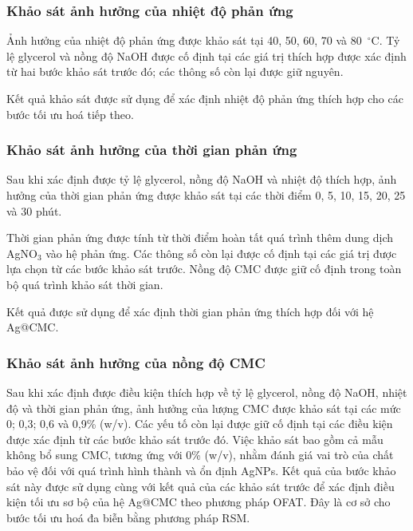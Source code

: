 \subsubsection{Khảo sát ảnh hưởng của nhiệt độ phản ứng}
Ảnh hưởng của nhiệt độ phản ứng được khảo sát tại 40, 50, 60, 70 và 80~$^\circ$C.
Tỷ lệ glycerol và nồng độ NaOH được cố định tại các giá trị thích hợp được xác định từ hai bước khảo sát trước đó; các thông số còn lại được giữ nguyên.

Kết quả khảo sát được sử dụng để xác định nhiệt độ phản ứng thích hợp cho các bước tối ưu hoá tiếp theo.

\subsubsection{Khảo sát ảnh hưởng của thời gian phản ứng}
Sau khi xác định được tỷ lệ glycerol, nồng độ NaOH và nhiệt độ thích hợp, ảnh hưởng của thời gian phản ứng được khảo sát tại các thời điểm 0, 5, 10, 15, 20, 25 và 30 phút.

Thời gian phản ứng được tính từ thời điểm hoàn tất quá trình thêm dung dịch AgNO$_3$ vào hệ phản ứng.
Các thông số còn lại được cố định tại các giá trị được lựa chọn từ các bước khảo sát trước.
Nồng độ CMC được giữ cố định trong toàn bộ quá trình khảo sát thời gian.

Kết quả được sử dụng để xác định thời gian phản ứng thích hợp đối với hệ Ag@CMC.

\subsubsection{Khảo sát ảnh hưởng của nồng độ CMC}
Sau khi xác định được điều kiện thích hợp về tỷ lệ glycerol, nồng độ NaOH, nhiệt độ và thời gian phản ứng, ảnh hưởng của lượng CMC được khảo sát tại các mức 0; 0,3; 0,6 và 0,9\% (w/v).
Các yếu tố còn lại được giữ cố định tại các điều kiện được xác định từ các bước khảo sát trước đó.
Việc khảo sát bao gồm cả mẫu không bổ sung CMC, tương ứng với 0\% (w/v), nhằm đánh giá vai trò của chất bảo vệ đối với quá trình hình thành và ổn định AgNPs.
Kết quả của bước khảo sát này được sử dụng cùng với kết quả của các khảo sát trước để xác định điều kiện tối ưu sơ bộ của hệ Ag@CMC theo phương pháp OFAT. 
Đây là cơ sở cho bước tối ưu hoá đa biễn bằng phương pháp RSM.

